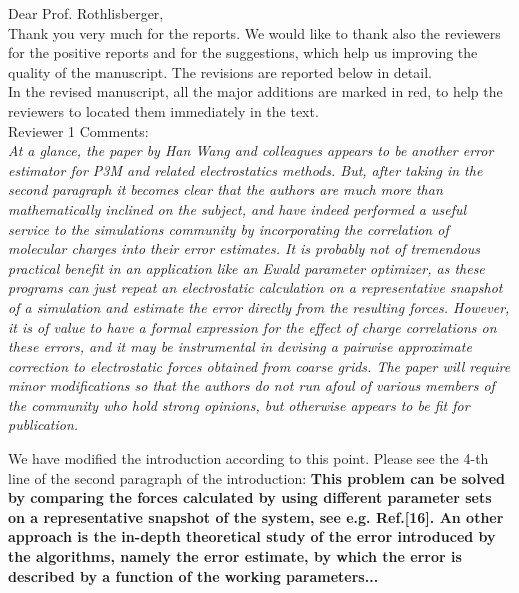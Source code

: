 \documentclass[a4paper]{article}
\begin{document}
\noindent
Dear Prof. Rothlisberger,\\

Thank you very much for the reports. We would like to thank also the
reviewers for the positive reports and for the suggestions, which help
us improving the quality of the manuscript. The revisions are
reported below in detail.\\

In the revised manuscript, all the major additions are marked in red, to help the
reviewers to located them immediately in the text.\\

\noindent
Reviewer  1 Comments:\\

\textit{ At a glance, the paper by Han Wang and colleagues appears to
  be another error estimator for P3M and related electrostatics
  methods.  But, after taking in the second paragraph it becomes clear
  that the authors are much more than mathematically inclined on the
  subject, and have indeed performed a useful service to the
  simulations community by incorporating the correlation of molecular
  charges into their error estimates.  It is probably not of
  tremendous practical benefit in an application like an Ewald
  parameter optimizer, as these programs can just repeat an
  electrostatic calculation on a representative snapshot of a
  simulation and estimate the error directly from the resulting
  forces.  However, it is of value to have a formal expression for the
  effect of charge correlations on these errors, and it may be
  instrumental in devising a pairwise approximate correction to
  electrostatic forces obtained from coarse grids.  The paper will
  require minor modifications so that the authors do not run afoul of
  various members of the community who hold strong opinions, but
  otherwise appears to be fit for publication.
}

We have modified the introduction according to this point.
Please see the 4-th line of the second paragraph of the introduction:
\textbf{
  This problem can be solved by  comparing
  the forces calculated by
  using different parameter sets
  on a representative snapshot of the system,
  see e.g. Ref.[16].
An other approach is the 
  in-depth theoretical study
of the error introduced by the algorithms, namely the
error estimate,
by which the error is described by a function of the working
parameters...
}\\
\end{document}
